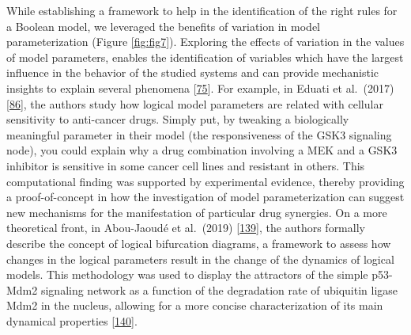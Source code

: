 \documentclass[
  12pt,
]{book}
\begin{document}
While establishing a framework to help in the identification of the right rules for a Boolean model, we leveraged the benefits of variation in model parameterization (Figure \ref{fig:fig7}).
Exploring the effects of variation in the values of model parameters, enables the identification of variables which have the largest influence in the behavior of the studied systems and can provide mechanistic insights to explain several phenomena {[}\protect\hyperlink{ref-Aldridge2006}{75}{]}.
For example, in Eduati et al.~(2017) {[}\protect\hyperlink{ref-Eduati2017}{86}{]}, the authors study how logical model parameters are related with cellular sensitivity to anti-cancer drugs.
Simply put, by tweaking a biologically meaningful parameter in their model (the responsiveness of the GSK3 signaling node), you could explain why a drug combination involving a MEK and a GSK3 inhibitor is sensitive in some cancer cell lines and resistant in others.
This computational finding was supported by experimental evidence, thereby providing a proof-of-concept in how the investigation of model parameterization can suggest new mechanisms for the manifestation of particular drug synergies.
On a more theoretical front, in Abou-Jaoudé et al.~(2019) {[}\protect\hyperlink{ref-Abou-Jaoude2019}{139}{]}, the authors formally describe the concept of logical bifurcation diagrams, a framework to assess how changes in the logical parameters result in the change of the dynamics of logical models.
This methodology was used to display the attractors of the simple p53-Mdm2 signaling network as a function of the degradation rate of ubiquitin ligase Mdm2 in the nucleus, allowing for a more concise characterization of its main dynamical properties {[}\protect\hyperlink{ref-Abou-Jaoude2009}{140}{]}.
\end{document}
